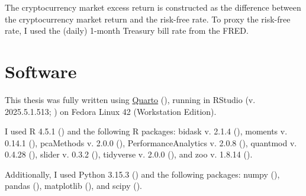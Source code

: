 \documentclass[
  12pt,
  a4paper,
  openany]{scrbook}
\begin{document}
The cryptocurrency market excess return is constructed as the difference
between the cryptocurrency market return and the risk-free rate. To
proxy the risk-free rate, I used the (daily) 1-month Treasury bill rate
from the FRED.

\section{Software}\label{sec-software}

This thesis was fully written using \href{https://quarto.org/}{Quarto}
(), running in RStudio
(v. 2025.5.1.513; ) on Fedora
Linux 42 (Workstation Edition).

I used R 4.5.1 () and the
following R packages: bidask v. 2.1.4 (), moments v. 0.14.1 (), pcaMethods v. 2.0.0
(),
PerformanceAnalytics v. 2.0.8
(), quantmod
v. 0.4.28 (), slider v.
0.3.2 (), tidyverse v. 2.0.0
(), and zoo v. 1.8.14
().

Additionally, I used Python 3.15.3 () and the following packages: numpy
(), pandas
(),
matplotlib (), and scipy
().


\backmatter
\end{document}
